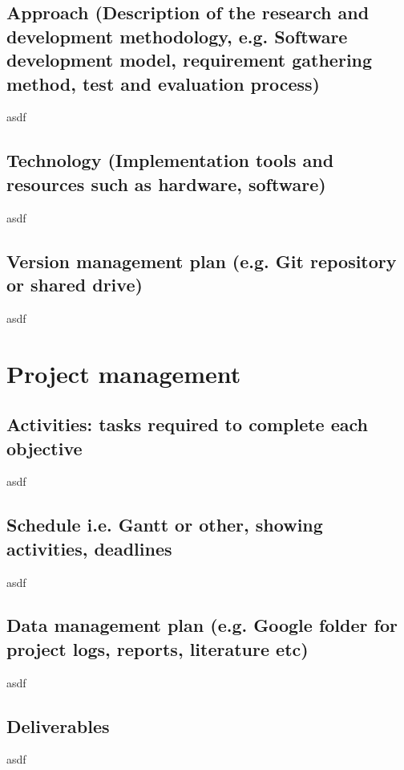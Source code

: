 \documentclass[12pt]{article}
\begin{document}
\subsection{Approach (Description of the research and development methodology, e.g. Software
development model, requirement gathering method, test and evaluation process)}
asdf
\subsection{Technology (Implementation tools and resources such as hardware, software)}
asdf
\subsection{Version management plan (e.g. Git repository or shared drive)}
asdf

\section{Project management}
\subsection{Activities: tasks required to complete each objective}
asdf
\subsection{Schedule i.e. Gantt or other, showing activities, deadlines}
asdf
\subsection{Data management plan (e.g. Google folder for project logs, reports, literature etc)}
asdf
\subsection{Deliverables}
asdf



\end{document}
